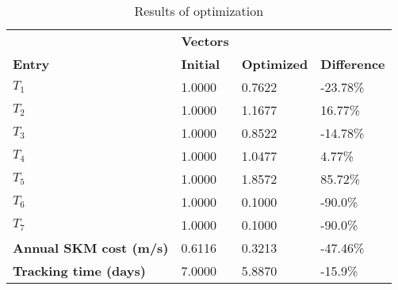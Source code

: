\begin{table}[H]
\centering
\begin{tabular}{llll}
\textbf{}      & \cellcolor[HTML]{EFEFEF}\textbf{Vectors} & \textbf{} & \textbf{}         \\
\rowcolor[HTML]{EFEFEF} 
\textbf{Entry} & \textbf{Initial} & \textbf{Optimized} & \textbf{Difference} \\
$T_1$ & 1.0000 & 0.7622 & -23.78\% \\ 
$T_2$ & 1.0000 & 1.1677 & 16.77\% \\ 
$T_3$ & 1.0000 & 0.8522 & -14.78\% \\ 
$T_4$ & 1.0000 & 1.0477 & 4.77\% \\ 
$T_5$ & 1.0000 & 1.8572 & 85.72\% \\ 
$T_6$ & 1.0000 & 0.1000 & -90.0\% \\ 
$T_7$ & 1.0000 & 0.1000 & -90.0\% \\ 
\rowcolor[HTML]{EFEFEF} 
\textbf{Annual SKM cost (m/s)}  & 0.6116 & 0.3213 & -47.46\% \\ 
\rowcolor[HTML]{EFEFEF} 
\textbf{Tracking time (days)}  & 7.0000 & 5.8870 & -15.9\% \\ 
\end{tabular}
\caption{Results of optimization}
\label{tab:OptimizationAnalysis}
\end{table}